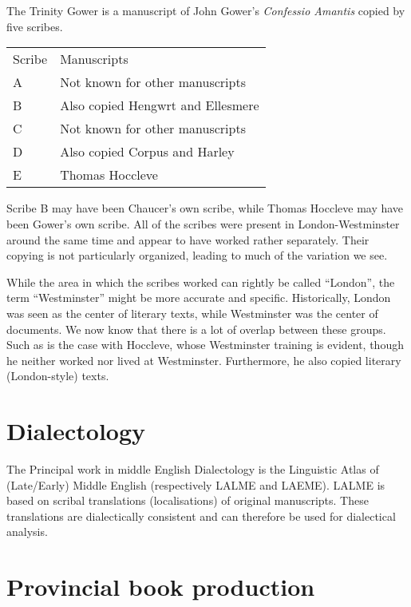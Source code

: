 \documentclass[12pt]{report}
\begin{document}
\chapter{}

The Trinity Gower is a manuscript of John Gower's \textit{Confessio Amantis}
copied by five scribes.

\begin{tabular}{l|l}
	Scribe & Manuscripts\\
	A & Not known for other manuscripts\\
	B & Also copied Hengwrt and Ellesmere\\
	C & Not known for other manuscripts\\
	D & Also copied Corpus and Harley\\
	E & Thomas Hoccleve\\
\end{tabular}

Scribe B may have been Chaucer's own scribe, while Thomas Hoccleve may have been
Gower's own scribe.  All of the scribes were present in London-Westminster
around the same time and appear to have worked rather separately. Their copying
is not particularly organized, leading to much of the variation we see.

While the area in which the scribes worked can rightly be called ``London'', the
term ``Westminster'' might be more accurate and specific. Historically, London
was seen as the center of literary texts, while Westminster was the center of
documents. We now know that there is a lot of overlap between these groups. Such
as is the case with Hoccleve, whose Westminster training is evident, though he
neither worked nor lived at Westminster. Furthermore, he also copied literary
(London-style) texts.

\chapter{Dialectology}

The Principal work in middle English Dialectology is the Linguistic Atlas of
(Late/Early) Middle English (respectively LALME and LAEME). LALME is based on
scribal translations (localisations) of original manuscripts. These
translations are dialectically consistent and can therefore be used for
dialectical analysis.

\chapter{Provincial book production}
\end{document}
